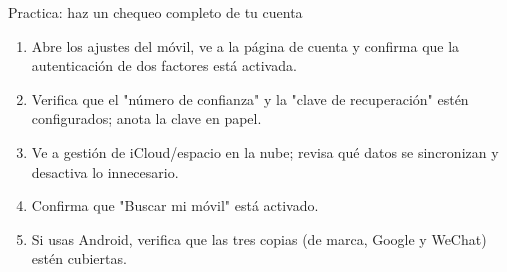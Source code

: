 \begin{tcbpractice}{Practica: haz un chequeo completo de tu cuenta}
\begin{enumerate}
  \item Abre los ajustes del móvil, ve a la página de cuenta y confirma que la autenticación de dos factores está activada.
  \item Verifica que el "número de confianza" y la "clave de recuperación" estén configurados; anota la clave en papel.
  \item Ve a gestión de iCloud/espacio en la nube; revisa qué datos se sincronizan y desactiva lo innecesario.
  \item Confirma que "Buscar mi móvil" está activado.
  \item Si usas Android, verifica que las tres copias (de marca, Google y WeChat) estén cubiertas.
\end{enumerate}

\end{tcbpractice}
